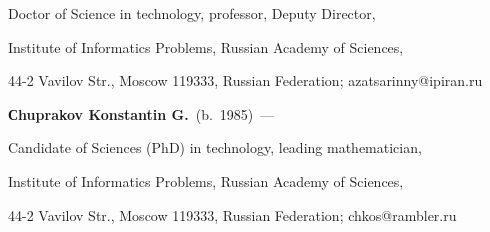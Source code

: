 Doctor of Science in technology, professor, Deputy Director,

Institute of Informatics Problems, Russian Academy of Sciences,

44-2 Vavilov Str., Moscow 119333, Russian Federation; azatsarinny@ipiran.ru



\vspace*{3pt}



\noindent

\textbf{Сhuprakov Konstantin G.}\ (b.\ 1985)~---

Candidate of Sciences (PhD) in technology, leading mathematician,

Institute of Informatics Problems, Russian Academy of Sciences,

44-2 Vavilov Str., Moscow 119333, Russian Federation;  chkos@rambler.ru

\label{end\stat}



\renewcommand{\bibname}{\protect\rm Литература}